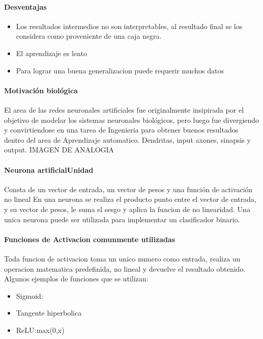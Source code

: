 \documentclass[a4paper,10pt]{article}
\begin{document}
      \paragraph {Desventajas}
	\begin{itemize}
	  \item Los resultados intermedios no son interpretables, al resultado final se los considera como proveniente de una caja negra.
	  \item El aprendizaje es lento
	  \item Para lograr una buena generalizacion puede requerir muchos datos
	\end{itemize}

      \paragraph {Motivación biológica} 
	El area de las redes neuronales artificiales fue originalmente insipirada por el objetivo de modelar los sistemas neuronales biológicos, 
	pero luego fue divergiendo
	y convirtiendose en una tarea de Ingenieria para obtener buenos resultados dentro del area de Aprendizaje automatico.
	Dendritas, input axones, sinapsis y output.
	IMAGEN DE ANALOGIA

      \paragraph {Neurona artificialUnidad}
	Consta de un vector de entrada, un vector de pesos y una función de activación no lineal
	En una neurona se realiza el producto punto entre el vector de entrada, y su vector de pesos, le suma el sesgo y aplica la funcion de no linearidad.
	Una unica neurona puede ser utilizada para implementar un clasificador binario.

      \paragraph {Funciones de Activacion comunmente utilizadas}
	Toda funcion de activacion toma un unico numero como entrada, realiza un operacion matematica predefinida, no lineal y devuelve el resultado obtenido.
	Algunos ejemplos de funciones que se utilizan:
	\begin{itemize}
	  \item Sigmoid:
	  \item Tangente hiperbolica
	  \item ReLU:max(0,x)
	\end{itemize}
\end{document}
